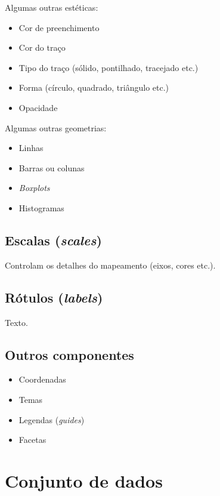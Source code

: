 \documentclass[
  11pt]{report}
\providecommand{\tightlist}{%
  \setlength{\itemsep}{0pt}\setlength{\parskip}{0pt}}
\begin{document}
Algumas outras estéticas:

\begin{itemize}
\tightlist
\item
  Cor de preenchimento
\item
  Cor do traço
\item
  Tipo do traço (sólido, pontilhado, tracejado etc.)
\item
  Forma (círculo, quadrado, triângulo etc.)
\item
  Opacidade
\end{itemize}

Algumas outras geometrias:

\begin{itemize}
\tightlist
\item
  Linhas
\item
  Barras ou colunas
\item
  \emph{Boxplots}
\item
  Histogramas
\end{itemize}

\hypertarget{escalas-scales}{%
\subsection{\texorpdfstring{Escalas (\emph{scales})}{Escalas (scales)}}\label{escalas-scales}}

Controlam os detalhes do mapeamento (eixos, cores etc.).

\hypertarget{ruxf3tulos-labels}{%
\subsection{\texorpdfstring{Rótulos (\emph{labels})}{Rótulos (labels)}}\label{ruxf3tulos-labels}}

Texto.

\hypertarget{outros-componentes}{%
\subsection{Outros componentes}\label{outros-componentes}}

\begin{itemize}
\tightlist
\item
  Coordenadas
\item
  Temas
\item
  Legendas (\emph{guides})
\item
  Facetas
\end{itemize}

\hypertarget{conjunto-de-dados}{%
\section{Conjunto de dados}\label{conjunto-de-dados}}
\end{document}
